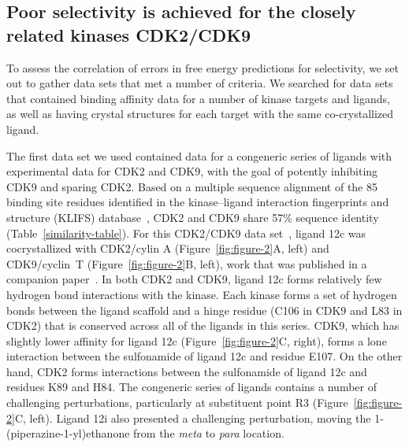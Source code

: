 \documentclass[phd,tocprelim]{cornell}
\begin{document}
\subsection{Poor selectivity is achieved for the closely related kinases CDK2/CDK9}

To assess the correlation of errors in free energy predictions for selectivity, we set out to gather data sets that met a number of criteria. 
We searched for data sets that contained binding affinity data for a number of kinase targets and ligands, as well as having crystal structures for each target with the same co-crystallized ligand. 

The first data set we used contained data for a congeneric series of ligands with experimental data for CDK2 and CDK9, with the goal of potently inhibiting CDK9 and sparing CDK2. 
Based on a multiple sequence alignment of the 85 binding site residues identified in the kinase–ligand interaction fingerprints and structure (KLIFS) database~\cite{Kooistra:2016fr,vanLinden:2014ea}, CDK2 and CDK9 share 57\% sequence identity (Table~\ref{similarity-table}).   
For this CDK2/CDK9 data set~\citep{Shao2013-oe}, ligand 12c was cocrystallized with CDK2/cylin A (Figure~\ref{fig:figure-2}A, left) and CDK9/cyclin~T (Figure~\ref{fig:figure-2}B, left), work that was published in a companion paper~\citep{Hole2013-sr}. 
In both CDK2 and CDK9, ligand 12c forms relatively few hydrogen bond interactions with the kinase. 
Each kinase forms a set of hydrogen bonds between the ligand scaffold and a hinge residue (C106 in CDK9 and L83 in CDK2) that is conserved across all of the ligands in this series. 
CDK9, which has slightly lower affinity for ligand 12c (Figure~\ref{fig:figure-2}C, right), forms a lone interaction between the sulfonamide of ligand 12c and residue E107. 
On the other hand, CDK2 forms interactions between the sulfonamide of ligand 12c and residues K89 and H84. 
The congeneric series of ligands contains a number of challenging perturbations, particularly at substituent point R3 (Figure~\ref{fig:figure-2}C, left). Ligand 12i also presented a challenging perturbation, moving the 1-(piperazine-1-yl)ethanone from the \emph{meta} to \emph{para} location. 
\end{document}
